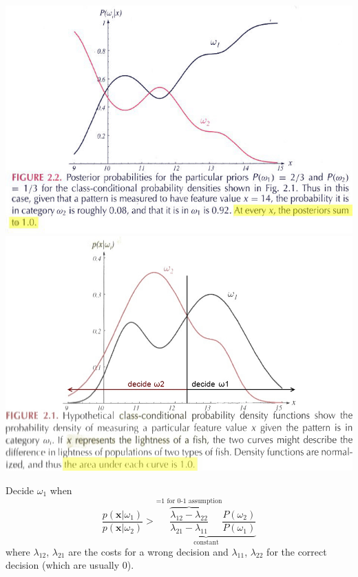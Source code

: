 \begin{minipage}{9cm}
\includegraphics[width=\linewidth]{./images/posterior-prob.jpg}
\includegraphics[width=\linewidth]{./images/class-cond-prob.jpg}
\end{minipage}

Decide $\omega_1$ when
$$\frac{p(\mathbf{x}|\omega_1)}{p(\mathbf{x}|\omega_2)} > \underbrace{
\overbrace{\frac{\lambda_{12} - \lambda_{22}}{\lambda_{21} - \lambda_{11}}}^{\text{=1 for 0-1 assumption}} \frac{P(\omega_2)}{P(\omega_1)}}_{\text{constant}}$$
where $\lambda_{12}$, $\lambda_{21}$ are the costs for a wrong decision and 
$\lambda_{11}$, $\lambda_{22}$ for the correct decision (which are usually $0$).

